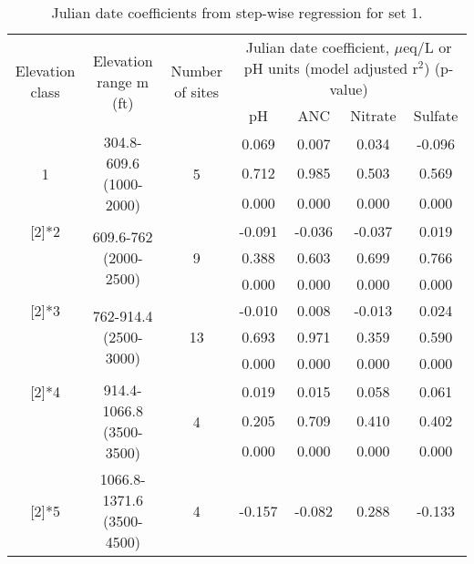 \begin{table}[htbp]
  \centering
  \caption{Julian date coefficients from step-wise regression for set 1.}
    \begin{tabular}{ccccccc}
    \toprule
    \multirow{3}[4]{2cm}{Elevation class} & \multirow{3}[4]{2.5cm}{Elevation range m (ft)} & \multirow{3}[4]{2cm}{Number of sites} & \multicolumn{4}{c}{\multirow{2}[2]{7cm}{Julian date coefficient, $\mu$eq/L or pH units (model adjusted r$^2$) (p-value)}} \\ 
          &       &       & \multicolumn{4}{c}{}\bigstrut\\\cline{4-7}\noalign{\smallskip}
          &       &       & pH    & ANC   & Nitrate & Sulfate \\
\midrule
    \multirow{3}[2]{*}{1} & \multirow{3}[2]{2.5cm}{304.8-609.6 (1000-2000)} & \multirow{3}[2]{*}{5} & 0.069  & 0.007  & 0.034  & -0.096  \\
          &       &       & 0.712  & 0.985  & 0.503  & 0.569  \\
          &       &       & 0.000  & 0.000  & 0.000  & 0.000  \bigstrut\\\cline{4-7}\noalign{\smallskip}
    \multirow{3}[2]{*}{2} & \multirow{3}[2]{2.5cm}{609.6-762 (2000-2500)} & \multirow{3}[2]{*}{9} & -0.091  & -0.036  & -0.037  & 0.019  \\
          &       &       & 0.388  & 0.603  & 0.699  & 0.766  \\
          &       &       & 0.000  & 0.000  & 0.000  & 0.000  \bigstrut\\\cline{4-7}\noalign{\smallskip}
    \multirow{3}[2]{*}{3} & \multirow{3}[2]{2.5cm}{762-914.4 (2500-3000)} & \multirow{3}[2]{*}{13} & -0.010  & 0.008  & -0.013  & 0.024  \\
          &       &       & 0.693  & 0.971  & 0.359  & 0.590  \\
          &       &       & 0.000  & 0.000  & 0.000  & 0.000  \bigstrut\\\cline{4-7}\noalign{\smallskip}
    \multirow{3}[2]{*}{4} & \multirow{3}[2]{2.5cm}{914.4-1066.8 (3500-3500)} & \multirow{3}[2]{*}{4} & 0.019  & 0.015  & 0.058  & 0.061  \\
          &       &       & 0.205  & 0.709  & 0.410  & 0.402  \\
          &       &       & 0.000  & 0.000  & 0.000  & 0.000  \bigstrut\\\cline{4-7}\noalign{\smallskip}
    \multirow{3}[2]{*}{5} & \multirow{3}[2]{2.5cm}{1066.8-1371.6 (3500-4500)} & \multirow{3}[2]{*}{4} & -0.157  & -0.082  & 0.288  & -0.133  \\

\end{tabular}
\end{table}

